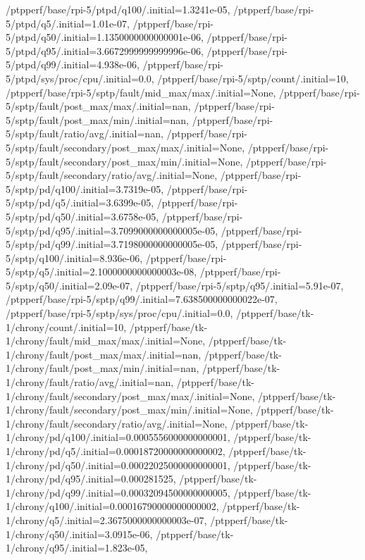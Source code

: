 {    /ptpperf/base/rpi-5/ptpd/q100/.initial=1.3241e-05,
    /ptpperf/base/rpi-5/ptpd/q5/.initial=1.01e-07,
    /ptpperf/base/rpi-5/ptpd/q50/.initial=1.1350000000000001e-06,
    /ptpperf/base/rpi-5/ptpd/q95/.initial=3.6672999999999996e-06,
    /ptpperf/base/rpi-5/ptpd/q99/.initial=4.938e-06,
    /ptpperf/base/rpi-5/ptpd/sys/proc/cpu/.initial=0.0,
    /ptpperf/base/rpi-5/sptp/count/.initial=10,
    /ptpperf/base/rpi-5/sptp/fault/mid_max/max/.initial=None,
    /ptpperf/base/rpi-5/sptp/fault/post_max/max/.initial=nan,
    /ptpperf/base/rpi-5/sptp/fault/post_max/min/.initial=nan,
    /ptpperf/base/rpi-5/sptp/fault/ratio/avg/.initial=nan,
    /ptpperf/base/rpi-5/sptp/fault/secondary/post_max/max/.initial=None,
    /ptpperf/base/rpi-5/sptp/fault/secondary/post_max/min/.initial=None,
    /ptpperf/base/rpi-5/sptp/fault/secondary/ratio/avg/.initial=None,
    /ptpperf/base/rpi-5/sptp/pd/q100/.initial=3.7319e-05,
    /ptpperf/base/rpi-5/sptp/pd/q5/.initial=3.6399e-05,
    /ptpperf/base/rpi-5/sptp/pd/q50/.initial=3.6758e-05,
    /ptpperf/base/rpi-5/sptp/pd/q95/.initial=3.7099000000000005e-05,
    /ptpperf/base/rpi-5/sptp/pd/q99/.initial=3.7198000000000005e-05,
    /ptpperf/base/rpi-5/sptp/q100/.initial=8.936e-06,
    /ptpperf/base/rpi-5/sptp/q5/.initial=2.1000000000000003e-08,
    /ptpperf/base/rpi-5/sptp/q50/.initial=2.09e-07,
    /ptpperf/base/rpi-5/sptp/q95/.initial=5.91e-07,
    /ptpperf/base/rpi-5/sptp/q99/.initial=7.638500000000022e-07,
    /ptpperf/base/rpi-5/sptp/sys/proc/cpu/.initial=0.0,
    /ptpperf/base/tk-1/chrony/count/.initial=10,
    /ptpperf/base/tk-1/chrony/fault/mid_max/max/.initial=None,
    /ptpperf/base/tk-1/chrony/fault/post_max/max/.initial=nan,
    /ptpperf/base/tk-1/chrony/fault/post_max/min/.initial=nan,
    /ptpperf/base/tk-1/chrony/fault/ratio/avg/.initial=nan,
    /ptpperf/base/tk-1/chrony/fault/secondary/post_max/max/.initial=None,
    /ptpperf/base/tk-1/chrony/fault/secondary/post_max/min/.initial=None,
    /ptpperf/base/tk-1/chrony/fault/secondary/ratio/avg/.initial=None,
    /ptpperf/base/tk-1/chrony/pd/q100/.initial=0.0005556000000000001,
    /ptpperf/base/tk-1/chrony/pd/q5/.initial=0.00018720000000000002,
    /ptpperf/base/tk-1/chrony/pd/q50/.initial=0.00022025000000000001,
    /ptpperf/base/tk-1/chrony/pd/q95/.initial=0.000281525,
    /ptpperf/base/tk-1/chrony/pd/q99/.initial=0.00032094500000000005,
    /ptpperf/base/tk-1/chrony/q100/.initial=0.00016790000000000002,
    /ptpperf/base/tk-1/chrony/q5/.initial=2.3675000000000003e-07,
    /ptpperf/base/tk-1/chrony/q50/.initial=3.0915e-06,
    /ptpperf/base/tk-1/chrony/q95/.initial=1.823e-05,
}

